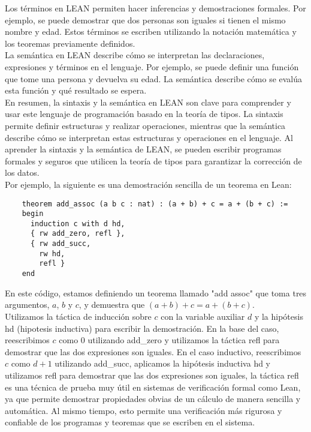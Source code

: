 \documentclass{article}
\begin{document}
Los términos en LEAN permiten hacer inferencias y demostraciones formales. Por ejemplo, se puede demostrar que dos personas son iguales si tienen el mismo nombre y edad. Estos términos se escriben utilizando la notación matemática y los teoremas previamente definidos.\\

La semántica en LEAN describe cómo se interpretan las declaraciones, expresiones y términos en el lenguaje. Por ejemplo, se puede definir una función que tome una persona y devuelva su edad. La semántica describe cómo se evalúa esta función y qué resultado se espera.\\

En resumen, la sintaxis y la semántica en LEAN son clave para comprender y usar este lenguaje de programación basado en la teoría de tipos. La sintaxis permite definir estructuras y realizar operaciones, mientras que la semántica describe cómo se interpretan estas estructuras y operaciones en el lenguaje. Al aprender la sintaxis y la semántica de LEAN, se pueden escribir programas formales y seguros que utilicen la teoría de tipos para garantizar la corrección de los datos.\\

Por ejemplo, la siguiente es una demostración sencilla de un teorema en
Lean:
\begin{lstlisting}
    theorem add_assoc (a b c : nat) : (a + b) + c = a + (b + c) :=
    begin
      induction c with d hd,
      { rw add_zero, refl },
      { rw add_succ,
        rw hd,
        refl }
    end
\end{lstlisting}
En este código, estamos definiendo un teorema llamado "add assoc" que toma
tres argumentos, $a$, $b$ y $c$, y demuestra que $(a + b) + c = a + (b +
	c)$.\\

Utilizamos la táctica de inducción sobre $c$ con la variable auxiliar $d$
y la hipótesis hd (hipotesis inductiva) para escribir la demostración. En
la base del caso, reescribimos $c$ como $0$ utilizando add\_zero y
utilizamos la táctica refl para demostrar que las dos expresiones son
iguales. En el caso inductivo, reescribimos $c$ como $d + 1$ utilizando
add\_succ, aplicamos la hipótesis inductiva hd y utilizamos refl para
demostrar que las dos expresiones son iguales, la táctica refl es una
técnica de prueba muy útil en sistemas de verificación formal como Lean,
ya que permite demostrar propiedades obvias de un cálculo de manera
sencilla y automática. Al mismo tiempo, esto permite una verificación más
rigurosa y confiable de los programas y teoremas que se escriben en el
sistema.
\end{document}
